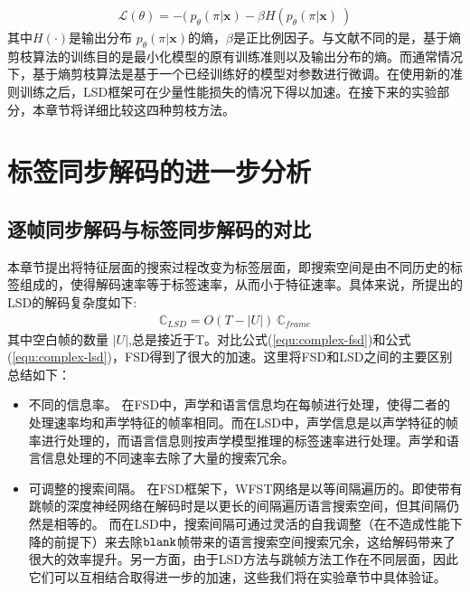 \begin{equation}
\label{equ:ent-pen-model}
\begin{split}
\mathcal{L}(\theta)= - (\ p_\theta (\pi|\mathbf{x}) - \beta H(p_\theta (\pi|\mathbf{x})\ )
\end{split}
\end{equation}
其中$H(\cdot)$是输出分布 $p_\theta (\pi|\mathbf{x})$的熵，$\beta$是正比例因子。与文献\cite{pereyra2017regularizing}不同的是，基于熵剪枝算法的训练目的是最小化模型的原有训练准则以及输出分布的熵。而通常情况下，基于熵剪枝算法是基于一个已经训练好的模型对参数进行微调。在使用新的准则训练之后，LSD框架可在少量性能损失的情况下得以加速。在接下来的实验部分，本章节将详细比较这四种剪枝方法。


\section{标签同步解码的进一步分析}
\label{chap:lsd-lsd-more}

\subsection{逐帧同步解码与标签同步解码的对比}
\label{chap:lsd-lsd-cmp}

本章节提出将特征层面的搜索过程改变为标签层面，即搜索空间是由不同历史的标签组成的，使得解码速率等于标签速率，从而小于特征速率。具体来说，所提出的LSD的解码复杂度如下:
  \begin{equation}
\label{equ:complex-lsd}
\begin{split}
\mathbb{C}_{LSD} = O (T-|U|) \ \mathbb{C}_{frame}
\end{split}
\end{equation}
其中空白帧的数量 $|U|$,总是接近于T。对比公式(\ref{equ:complex-fsd})和公式(\ref{equ:complex-lsd})，FSD得到了很大的加速。这里将FSD和LSD之间的主要区别总结如下：
\begin{itemize}
\item 不同的信息率。 在FSD中，声学和语言信息均在每帧进行处理，使得二者的处理速率均和声学特征的帧率相同。而在LSD中，声学信息是以声学特征的帧率进行处理的，而语言信息则按声学模型推理的标签速率进行处理。声学和语言信息处理的不同速率去除了大量的搜索冗余。
\item 可调整的搜索间隔。 在FSD框架下，WFST网络是以等间隔遍历的。即使带有跳帧的深度神经网络在解码\cite{vanhoucke2013multiframe}时是以更长的间隔遍历语言搜索空间，但其间隔仍然是相等的。 而在LSD中，搜索间隔可通过灵活的自我调整（在不造成性能下降的前提下）来去除$\tt blank$帧带来的语言搜索空间搜索冗余，这给解码带来了很大的效率提升。另一方面，由于LSD方法与跳帧方法工作在不同层面，因此它们可以互相结合取得进一步的加速，这些我们将在实验章节中具体验证。
\end{itemize}

